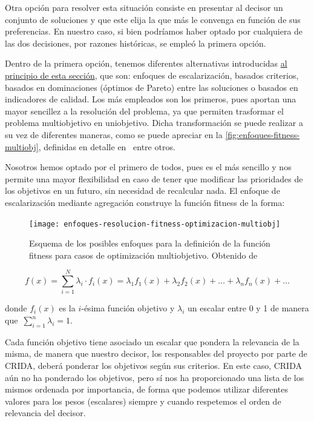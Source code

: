 Otra opción para resolver esta situación consiste en presentar al decisor un conjunto de soluciones y que este elija la que más le convenga en función de sus preferencias. En nuestro caso, si bien podríamos haber optado por cualquiera de las dos decisiones, por razones históricas, se empleó la primera opción.

Dentro de la primera opción, tenemos diferentes alternativas introducidas \hyperref[sec:3:metaheurística]{al principio de esta sección}, que son: enfoques de escalarización, basados criterios, basados en dominaciones (óptimos de Pareto) entre las soluciones o basados en indicadores de calidad. Los más empleados son los primeros, pues aportan una mayor sencillez a la resolución del problema, ya que permiten trasformar el problema multiobjetivo en uniobjetivo. Dicha transformación se puede realizar a su vez de diferentes maneras, como se puede apreciar en la \autoref{fig:enfoques-fitness-multiobj}, definidas en detalle en~\cite{sota:metaheuristicas-design-impl} entre otros.

Nosotros hemos optado por el primero de todos, pues es el más sencillo y nos permite una mayor flexibilidad en caso de tener que modificar las prioridades de los objetivos en un futuro, sin necesidad de recalcular nada. El enfoque de escalarización mediante agregación construye la función fitness de la forma:

\begin{figure}
    \centering
    \texttt{[image: enfoques-resolucion-fitness-optimizacion-multiobj]}
    \caption[Esquema de los posibles enfoques para la definición de la función fitness para casos de optimización multiobjetivo]{Esquema de los posibles enfoques para la definición de la función fitness para casos de optimización multiobjetivo. Obtenido de~\cite{sota:metaheuristicas-design-impl}}
    \label{fig:enfoques-fitness-multiobj}
\end{figure}
%
\[
    f(x) = \sum_{i=1}^{N} \lambda_i \cdot f_i(x) = \lambda_1 f_1(x) + \lambda_2 f_2(x) + \dots + \lambda_n f_n(x) + \dots
\]

donde $f_i(x)$ es la $i$-ésima función objetivo y $\lambda_i$ un escalar entre 0 y 1 de manera que~$\sum_{i=1}^n \lambda_i = 1$.

Cada función objetivo tiene asociado un escalar que pondera la relevancia de la misma, de manera que nuestro decisor, los responsables del proyecto por parte de \gls{CRIDA}, deberá ponderar los objetivos según sus criterios. En este caso, CRIDA aún no ha ponderado los objetivos, pero sí nos ha proporcionado una lista de los mismos ordenada por importancia, de forma que podemos utilizar diferentes valores para los pesos (escalares) siempre y cuando respetemos el orden de relevancia del decisor.

